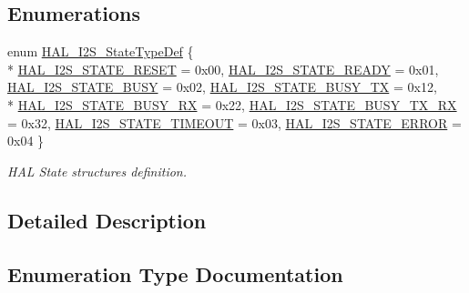 \subsection*{Enumerations}
\begin{DoxyCompactItemize}
\item 
enum \hyperlink{group___i2_s___exported___types_ga2588a0c71baf7cd6d2c1b9b11120bef0}{H\+A\+L\+\_\+\+I2\+S\+\_\+\+State\+Type\+Def} \{ \\*
\hyperlink{group___i2_s___exported___types_gga2588a0c71baf7cd6d2c1b9b11120bef0a2b69279eb021ef38d711edcdc5c95054}{H\+A\+L\+\_\+\+I2\+S\+\_\+\+S\+T\+A\+T\+E\+\_\+\+R\+E\+S\+ET} = 0x00, 
\hyperlink{group___i2_s___exported___types_gga2588a0c71baf7cd6d2c1b9b11120bef0afb3efb92ef3bcfce6f4d34570b31a602}{H\+A\+L\+\_\+\+I2\+S\+\_\+\+S\+T\+A\+T\+E\+\_\+\+R\+E\+A\+DY} = 0x01, 
\hyperlink{group___i2_s___exported___types_gga2588a0c71baf7cd6d2c1b9b11120bef0a0d9faadcd5b6010c6071905345a282e7}{H\+A\+L\+\_\+\+I2\+S\+\_\+\+S\+T\+A\+T\+E\+\_\+\+B\+U\+SY} = 0x02, 
\hyperlink{group___i2_s___exported___types_gga2588a0c71baf7cd6d2c1b9b11120bef0ab8386636ae24469508b8312e7bfbc4b3}{H\+A\+L\+\_\+\+I2\+S\+\_\+\+S\+T\+A\+T\+E\+\_\+\+B\+U\+S\+Y\+\_\+\+TX} = 0x12, 
\\*
\hyperlink{group___i2_s___exported___types_gga2588a0c71baf7cd6d2c1b9b11120bef0a641d635762b2ebb2e8e16917efc13162}{H\+A\+L\+\_\+\+I2\+S\+\_\+\+S\+T\+A\+T\+E\+\_\+\+B\+U\+S\+Y\+\_\+\+RX} = 0x22, 
\hyperlink{group___i2_s___exported___types_gga2588a0c71baf7cd6d2c1b9b11120bef0a4135585ed147654154c0b7be15f3807e}{H\+A\+L\+\_\+\+I2\+S\+\_\+\+S\+T\+A\+T\+E\+\_\+\+B\+U\+S\+Y\+\_\+\+T\+X\+\_\+\+RX} = 0x32, 
\hyperlink{group___i2_s___exported___types_gga2588a0c71baf7cd6d2c1b9b11120bef0a95d3eabfe7ff5d52af473e7fc96f9536}{H\+A\+L\+\_\+\+I2\+S\+\_\+\+S\+T\+A\+T\+E\+\_\+\+T\+I\+M\+E\+O\+UT} = 0x03, 
\hyperlink{group___i2_s___exported___types_gga2588a0c71baf7cd6d2c1b9b11120bef0a011e8568b5b81c7074f2cbfa38b8a2d8}{H\+A\+L\+\_\+\+I2\+S\+\_\+\+S\+T\+A\+T\+E\+\_\+\+E\+R\+R\+OR} = 0x04
 \}\begin{DoxyCompactList}\small\item\em H\+AL State structures definition. \end{DoxyCompactList}
\end{DoxyCompactItemize}


\subsection{Detailed Description}


\subsection{Enumeration Type Documentation}
